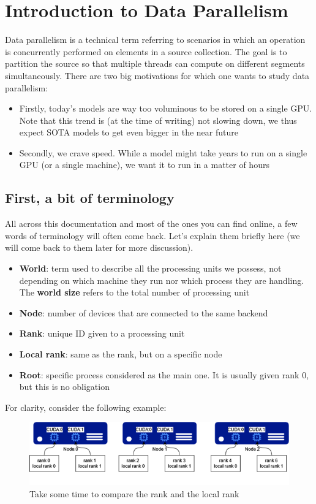 \documentclass{article}
\begin{document}
\clearpage

\section{Introduction to Data Parallelism}
Data parallelism is a technical term referring to scenarios in which an operation is concurrently performed on elements in a source collection. The goal is to partition the source so that multiple threads can compute on different segments simultaneously. There are two big motivations for which one wants to study data parallelism:
\begin{itemize}
  \item Firstly, today's models are way too voluminous to be stored on a single GPU. Note that this trend is (at the time of writing) not slowing down, we thus expect \Gls{SOTA} models to get even bigger in the near future
  \item Secondly, we crave speed. While a model might take years to run on a single GPU (or a single machine), we want it to run in a matter of hours
\end{itemize}

\subsection{First, a bit of terminology}
All across this documentation and most of the ones you can find online, a few words of terminology will often come back. Let's explain them briefly here (we will come back to them later for more discussion).

\begin{itemize}
  \item \textbf{World}: term used to describe all the processing units we possess, not depending on which machine they run nor which process they are handling. The \textbf{world size} refers to the total number of processing unit
  \item \textbf{Node}: number of devices that are connected to the same backend
  \item \textbf{Rank}: unique ID given to a processing unit
  \item \textbf{Local rank}: same as the rank, but on a specific node
  \item \textbf{Root}: specific process considered as the main one. It is usually given rank 0, but this is no obligation
\end{itemize}
For clarity, consider the following example:
\begin{figure}[h!]
  \center
  \includegraphics[width=0.7\linewidth]{images/2022-08-24-17-37-31.png}
  \caption{Take some time to compare the rank and the local rank}
\end{figure}
\FloatBarrier
\end{document}
